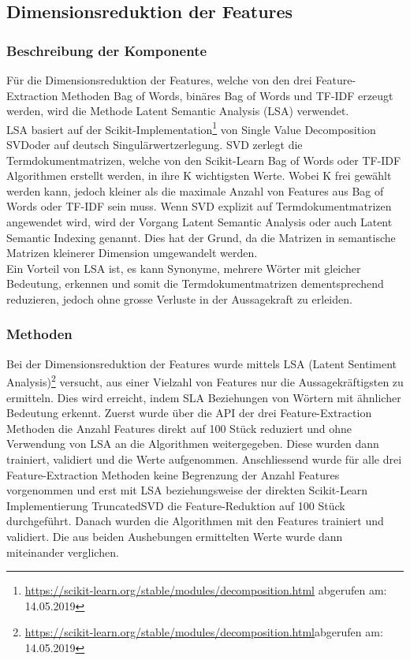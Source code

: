 \subsection{Dimensionsreduktion der Features}
\subsubsection{Beschreibung der Komponente}
Für die Dimensionsreduktion der Features, welche von den drei Feature-Extraction Methoden  \glqq Bag of Words\grqq{}, \glqq binäres Bag of Words\grqq{} und \glqq TF-IDF\grqq{} erzeugt werden, wird die Methode \glqq Latent Semantic Analysis\grqq{} (LSA) verwendet.\\
LSA basiert auf der Scikit-Implementation\footnote{\url{https://scikit-learn.org/stable/modules/decomposition.html} abgerufen am: 14.05.2019} von \glqq Single Value Decomposition SVD\grqq{}oder auf deutsch \glqq Singulärwertzerlegung\grqq{}.
SVD zerlegt die Termdokumentmatrizen, welche von den Scikit-Learn Bag of Words oder TF-IDF Algorithmen erstellt werden, in ihre K wichtigsten Werte. Wobei K frei gewählt werden kann, jedoch kleiner als die maximale Anzahl von Features aus Bag of Words oder TF-IDF sein muss.
Wenn SVD explizit auf Termdokumentmatrizen angewendet wird, wird der Vorgang \glqq Latent Semantic Analysis\grqq{} oder auch \glqq Latent Semantic Indexing\grqq{} genannt.
Dies hat der Grund, da die Matrizen in semantische Matrizen kleinerer Dimension umgewandelt werden.\\
Ein Vorteil von LSA ist, es kann Synonyme, mehrere Wörter mit gleicher Bedeutung, erkennen und somit die Termdokumentmatrizen dementsprechend reduzieren, jedoch ohne grosse Verluste in der Aussagekraft zu erleiden.
\subsubsection{Methoden}
Bei der Dimensionsreduktion der Features wurde mittels LSA (Latent Sentiment Analysis)\footnote{\url{https://scikit-learn.org/stable/modules/decomposition.html}abgerufen am: 14.05.2019} versucht, aus einer Vielzahl von Features nur die Aussagekräftigsten zu ermitteln.
Dies wird erreicht, indem SLA Beziehungen von Wörtern mit ähnlicher Bedeutung erkennt.
Zuerst wurde über die API der drei Feature-Extraction Methoden die Anzahl Features direkt auf 100 Stück reduziert und ohne Verwendung von LSA an die Algorithmen weitergegeben.
Diese wurden dann trainiert, validiert und die Werte aufgenommen.
Anschliessend wurde für alle drei Feature-Extraction Methoden keine Begrenzung der Anzahl Features vorgenommen und erst mit LSA beziehungsweise der direkten Scikit-Learn Implementierung \glqq TruncatedSVD\grqq{} die Feature-Reduktion auf 100 Stück durchgeführt.
Danach wurden die Algorithmen mit den Features trainiert und validiert.
Die aus beiden Aushebungen ermittelten Werte wurde dann miteinander verglichen.
